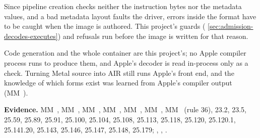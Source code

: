 Since pipeline creation checks neither the instruction bytes nor the metadata values, and a bad metadata layout faults
the driver, errors inside the format have to be caught when the image is authored. This project's guards (
\cref{sec:admission-decodes-executes}) and refusals run before the image is written for that reason.

Code generation and the whole container are this project's; no Apple compiler process
runs to produce them, and Apple's decoder is read in-process only as a check. Turning Metal source into AIR still runs
Apple's front end, and the knowledge of which forms exist was learned from Apple's compiler output (MM~).

\textbf{Evidence.} MM~, MM~, MM~, MM~, MM~, MM~, MM~ (rule 36), 23.2, 23.5, 25.59, 25.89, 25.91, 25.100, 25.104, 25.108,
25.113, 25.118, 25.120, 25.120.1, 25.141.20, 25.143, 25.146, 25.147, 25.148, 25.179; ,
, .
